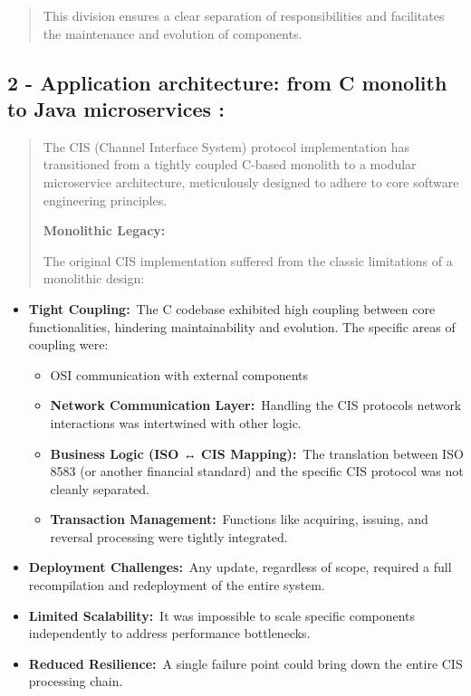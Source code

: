 \documentclass[12pt,a4paper]{report}
\begin{document}
\begin{quote}
This division ensures a clear separation of responsibilities and
facilitates the maintenance and evolution of components.
\end{quote}


\subsection{2 - Application architecture: from C
monolith to Java microservices
:}

\begin{quote}
The CIS (Channel Interface System) protocol implementation has
transitioned from a tightly coupled C-based monolith to a modular
microservice architecture, meticulously designed to adhere to core
software engineering principles.

\textbf{Monolithic Legacy:}

The original CIS implementation suffered from the classic limitations of
a monolithic design:
\end{quote}

\begin{itemize}
\item
  \textbf{Tight Coupling:}~The C codebase exhibited high coupling
  between core functionalities, hindering maintainability and evolution.
  The specific areas of coupling were:

  \begin{itemize}
  \item
    OSI communication with external components
  \item
    \textbf{Network Communication Layer:}~Handling the CIS
    protocol\textquotesingle s network interactions was intertwined with
    other logic.
  \item
    \textbf{Business Logic (ISO ↔ CIS Mapping):}~The translation between
    ISO 8583 (or another financial standard) and the specific CIS
    protocol was not cleanly separated.
  \item
    \textbf{Transaction Management:}~Functions like acquiring, issuing,
    and reversal processing were tightly integrated.
  \end{itemize}
\item
  \textbf{Deployment Challenges:}~Any update, regardless of scope,
  required a full recompilation and redeployment of the entire system.
\item
  \textbf{Limited Scalability:}~It was impossible to scale specific
  components independently to address performance bottlenecks.
\item
  \textbf{Reduced Resilience:}~A single failure point could bring down
  the entire CIS processing chain.
\end{itemize}
\end{document}
